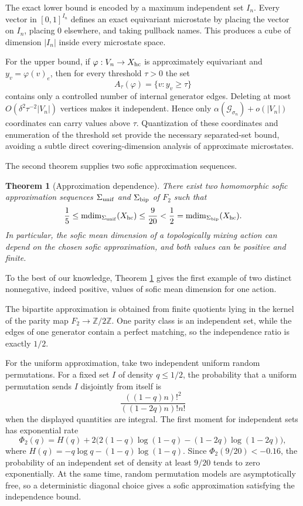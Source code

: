 \documentclass[12pt,a4paper]{amsart}
\newtheorem{theorem}{Theorem}[section]
\theoremstyle{definition}
\newcommand{\mdim}{\operatorname{mdim}}
\newcommand{\ind}{\alpha}
\newcommand{\cG}{\mathcal G}
\newcommand{\Z}{\mathbb Z}
\begin{document}
	The exact lower bound is encoded by a maximum independent set $I_n$.  Every vector in $[0,1]^{I_n}$ defines an exact equivariant microstate by placing the vector on $I_n$, placing $0$ elsewhere, and taking pullback names.  This produces a cube of dimension $|I_n|$ inside every microstate space.
	
	For the upper bound, if $\varphi:V_n\to X_{\rm hc}$ is approximately equivariant and $y_v=\varphi(v)_e$, then for every threshold $\tau>0$ the set
	\[
	A_\tau(\varphi)=\{v:y_v\ge \tau\}
	\]
	contains only a controlled number of internal generator edges.  Deleting at most $O(\delta^2\tau^{-2}|V_n|)$ vertices makes it independent.  Hence only $\ind(\cG_{\sigma_n})+o(|V_n|)$ coordinates can carry values above $\tau$. Quantization of these coordinates and enumeration of the threshold set provide the necessary separated-set bound, avoiding a subtle direct covering-dimension analysis of approximate microstates. 
	
	The second theorem supplies two sofic approximation sequences.
	
	\begin{theorem}[Approximation dependence]\label{thm:main}
		There exist two homomorphic sofic approximation sequences $\Sigma_{\rm unif}$ and $\Sigma_{\rm bip}$ of $F_2$ such that
		\[
		\frac15
		\le \mdim_{\Sigma_{\rm unif}}(X_{\rm hc})
		\le \frac9{20}
		<\frac12
		=\mdim_{\Sigma_{\rm bip}}(X_{\rm hc}).
		\]
		In particular, the sofic mean dimension of a topologically mixing action can depend on the chosen sofic approximation, and both values can be positive and finite.
	\end{theorem}
	To the best of our knowledge, Theorem \ref{thm:main} gives the first example of two distinct nonnegative, indeed positive, values of sofic mean dimension for one action.
    
	The bipartite approximation is obtained from finite quotients lying in the kernel of the parity map $F_2\to\Z/2\Z$.  One parity class is an independent set, while the edges of one generator contain a perfect matching, so the independence ratio is exactly $1/2$.
	
	For the uniform approximation, take two independent uniform random permutations.  For a fixed set $I$ of density $q\le 1/2$, the probability that a uniform permutation sends $I$ disjointly from itself is
	\[
	\frac{((1-q)n)!^2}{((1-2q)n)!n!}
	\]
	when the displayed quantities are integral.  The first moment for independent sets has exponential rate
	\begin{equation}\label{eq:Phi-intro}
		\Phi_2(q)=H(q)+2\bigl(2(1-q)\log(1-q)
		-(1-2q)\log(1-2q)\bigr),
	\end{equation}
	where $H(q)=-q\log q-(1-q)\log(1-q)$.  Since $\Phi_2(9/20)<-0.16$, the probability of an independent set of density at least $9/20$ tends to zero exponentially.  At the same time, random permutation models are asymptotically free, so a deterministic diagonal choice gives a sofic approximation satisfying the independence bound.
	
\end{document}
